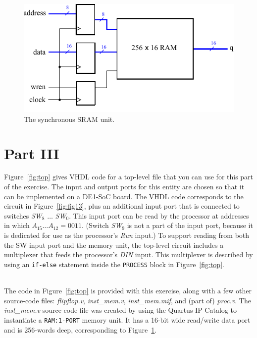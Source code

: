 \documentclass[epsfig,10pt,fullpage]{article}
\begin{document}
\begin{figure}[b]
\begin{center}
\includegraphics{figures/figure14.pdf}
\end{center}
\vspace{-0.5cm}
\caption{The synchronous SRAM unit.}
\label{fig:fig14}
\end{figure}

\section*{Part III}

Figure~\ref{fig:top} gives VHDL code for a top-level file that you can use for this
part of the exercise. The input and output ports for this entity are chosen so that it can
be implemented on a DE1-SoC board. The VHDL code corresponds to the circuit 
in Figure~\ref{fig:fig13},
plus an additional input port that is connected to switches {\it SW}$_8$ $\ldots$ {\it SW}$_0$.
This input port can be read by the processor at addresses in which $A_{15} \ldots A_{12} = 0011$.
(Switch {\it SW}$_9$ is not a part of the input port, because it is dedicated for use as the
processor's {\it Run} input.) To support reading from both the SW input port and the memory
unit, the top-level circuit includes a multiplexer that feeds the processor's {\it DIN}
input. This multiplexer is described by using an \texttt{if-else} statement inside 
the \texttt{PROCESS} block in Figure~\ref{fig:top}.

~\\
\noindent
The code in Figure~\ref{fig:top} is provided with this exercise, along with a few
other source-code files: {\it flipflop.v}, {\it inst\_mem.v}, {\it inst\_mem.mif}, and 
(part of) {\it proc.v}. The {\it inst\_mem.v} source-code file was created by using the Quartus IP 
Catalog to instantiate a \texttt{RAM:1-PORT} memory unit. It has a 16-bit wide read/write
data port and is 256-words deep, corresponding to Figure~\ref{fig:fig14}.
\end{document}
